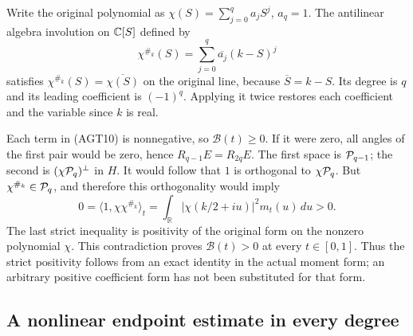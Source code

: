Write the original polynomial as $\chi(S)=\sum_{j=0}^qa_jS^j$,
$a_q=1$. The antilinear algebra involution on $\mathbb C[S]$ defined by
\[
 \chi^{\#_k}(S)=\sum_{j=0}^q\overline{a_j}(k-S)^j
 \tag{AGT12}
\]
satisfies $\chi^{\#_k}(S)=\overline{\chi(S)}$ on the original
line, because $\overline S=k-S$. Its degree is $q$ and its
leading coefficient is $(-1)^q$. Applying it twice restores
each coefficient and the variable since $k$ is real.

Each term in (AGT10) is nonnegative, so $\mathcal B(t)\ge0$.
If it were zero, all angles of the first pair would be zero,
hence $R_{q-1}E=R_{2q}E$. The first space is $\mathcal P_{q-1}$;
the second is $(\chi\mathcal P_q)^\perp$ in $H$.
It would follow that $1$ is orthogonal to $\chi\mathcal P_q$.
But $\chi^{\#_k}\in\mathcal P_q$, and therefore this orthogonality
would imply
\[
 0=\langle1,\chi\chi^{\#_k}\rangle_t
   =\int_{\mathbb R}|\chi(k/2+iu)|^2m_t(u)\,du>0.
 \tag{AGT13}
\]
The last strict inequality is positivity of the original form
on the nonzero polynomial $\chi$. This contradiction proves
$\mathcal B(t)>0$ at every $t\in[0,1]$. Thus the strict
positivity follows from an exact identity in the actual
moment form; an arbitrary positive coefficient form has not
been substituted for that form.

\subsection{A nonlinear endpoint estimate in every degree}

